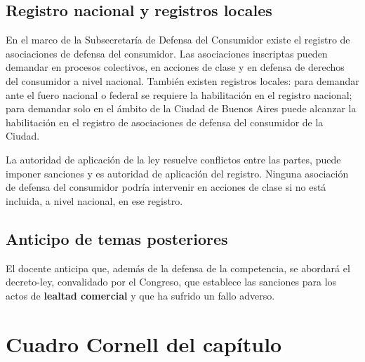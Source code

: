 \documentclass[12pt,oneside]{book}
\begin{document}
\subsection{Registro nacional y registros locales}

En el marco de la Subsecretaría de Defensa del Consumidor existe el registro de asociaciones de defensa del consumidor. Las asociaciones inscriptas pueden demandar en procesos colectivos, en acciones de clase y en defensa de derechos del consumidor a nivel nacional. También existen registros locales: para demandar ante el fuero nacional o federal se requiere la habilitación en el registro nacional; para demandar solo en el ámbito de la Ciudad de Buenos Aires puede alcanzar la habilitación en el registro de asociaciones de defensa del consumidor de la Ciudad.

La autoridad de aplicación de la ley resuelve conflictos entre las partes, puede imponer sanciones y es autoridad de aplicación del registro. Ninguna asociación de defensa del consumidor podría intervenir en acciones de clase si no está incluida, a nivel nacional, en ese registro.

\subsection{Anticipo de temas posteriores}

El docente anticipa que, además de la defensa de la competencia, se abordará el decreto-ley, convalidado por el Congreso, que establece las sanciones para los actos de \textbf{lealtad comercial} y que ha sufrido un fallo adverso.

\section{Cuadro Cornell del capítulo}
\end{document}
